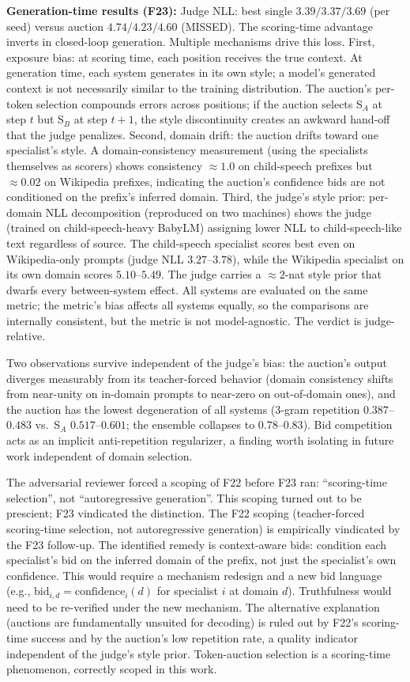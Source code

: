 \textbf{Generation-time results (F23):} Judge NLL: best single $3.39/3.37/3.69$ (per seed) versus auction $4.74/4.23/4.60$ (MISSED). The scoring-time advantage inverts in closed-loop generation. Multiple mechanisms drive this loss. First, exposure bias: at scoring time, each position receives the true context. At generation time, each system generates in its own style; a model's generated context is not necessarily similar to the training distribution. The auction's per-token selection compounds errors across positions; if the auction selects S$_A$ at step $t$ but S$_B$ at step $t+1$, the style discontinuity creates an awkward hand-off that the judge penalizes. Second, domain drift: the auction drifts toward one specialist's style. A domain-consistency measurement (using the specialists themselves as scorers) shows consistency $\approx 1.0$ on child-speech prefixes but $\approx 0.02$ on Wikipedia prefixes, indicating the auction's confidence bids are not conditioned on the prefix's inferred domain. Third, the judge's style prior: per-domain NLL decomposition (reproduced on two machines) shows the judge (trained on child-speech-heavy BabyLM) assigning lower NLL to child-speech-like text regardless of source. The child-speech specialist scores best even on Wikipedia-only prompts (judge NLL $3.27$--$3.78$), while the Wikipedia specialist on its own domain scores $5.10$--$5.49$. The judge carries a $\approx 2$-nat style prior that dwarfs every between-system effect. All systems are evaluated on the same metric; the metric's bias affects all systems equally, so the comparisons are internally consistent, but the metric is not model-agnostic. The verdict is judge-relative.

Two observations survive independent of the judge's bias: the auction's output diverges measurably from its teacher-forced behavior (domain consistency shifts from near-unity on in-domain prompts to near-zero on out-of-domain ones), and the auction has the lowest degeneration of all systems (3-gram repetition $0.387$--$0.483$ vs.\ S$_A$ $0.517$--$0.601$; the ensemble collapses to $0.78$--$0.83$). Bid competition acts as an implicit anti-repetition regularizer, a finding worth isolating in future work independent of domain selection.

The adversarial reviewer forced a scoping of F22 before F23 ran: ``scoring-time selection'', not ``autoregressive generation''. This scoping turned out to be prescient; F23 vindicated the distinction. The F22 scoping (teacher-forced scoring-time selection, not autoregressive generation) is empirically vindicated by the F23 follow-up. The identified remedy is context-aware bids: condition each specialist's bid on the inferred domain of the prefix, not just the specialist's own confidence. This would require a mechanism redesign and a new bid language (e.g., $\text{bid}_{i,d} = \text{confidence}_i(d)$ for specialist $i$ at domain $d$). Truthfulness would need to be re-verified under the new mechanism. The alternative explanation (auctions are fundamentally unsuited for decoding) is ruled out by F22's scoring-time success and by the auction's low repetition rate, a quality indicator independent of the judge's style prior. Token-auction selection is a scoring-time phenomenon, correctly scoped in this work.

